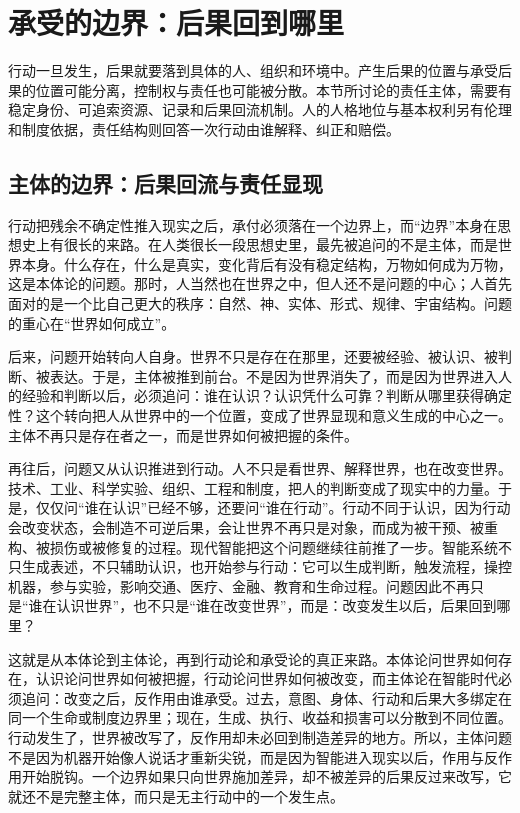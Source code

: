 \section{承受的边界：后果回到哪里}

行动一旦发生，后果就要落到具体的人、组织和环境中。产生后果的位置与承受后果的位置可能分离，控制权与责任也可能被分散。本节所讨论的责任主体，需要有稳定身份、可追索资源、记录和后果回流机制。人的人格地位与基本权利另有伦理和制度依据，责任结构则回答一次行动由谁解释、纠正和赔偿。

\subsection{主体的边界：后果回流与责任显现}

行动把残余不确定性推入现实之后，承付必须落在一个边界上，而“边界”本身在思想史上有很长的来路。在人类很长一段思想史里，最先被追问的不是主体，而是世界本身。什么存在，什么是真实，变化背后有没有稳定结构，万物如何成为万物，这是本体论的问题。那时，人当然也在世界之中，但人还不是问题的中心；人首先面对的是一个比自己更大的秩序：自然、神、实体、形式、规律、宇宙结构。问题的重心在“世界如何成立”。


后来，问题开始转向人自身。世界不只是存在在那里，还要被经验、被认识、被判断、被表达。于是，主体被推到前台。不是因为世界消失了，而是因为世界进入人的经验和判断以后，必须追问：谁在认识？认识凭什么可靠？判断从哪里获得确定性？这个转向把人从世界中的一个位置，变成了世界显现和意义生成的中心之一。主体不再只是存在者之一，而是世界如何被把握的条件\cite{kant1781kritik}。

再往后，问题又从认识推进到行动。人不只是看世界、解释世界，也在改变世界。技术、工业、科学实验、组织、工程和制度，把人的判断变成了现实中的力量。于是，仅仅问“谁在认识”已经不够，还要问“谁在行动”。行动不同于认识，因为行动会改变状态，会制造不可逆后果，会让世界不再只是对象，而成为被干预、被重构、被损伤或被修复的过程。现代智能把这个问题继续往前推了一步。智能系统不只生成表述，不只辅助认识，也开始参与行动：它可以生成判断，触发流程，操控机器，参与实验，影响交通、医疗、金融、教育和生命过程。问题因此不再只是“谁在认识世界”，也不只是“谁在改变世界”，而是：改变发生以后，后果回到哪里？

这就是从本体论到主体论，再到行动论和承受论的真正来路。本体论问世界如何存在，认识论问世界如何被把握，行动论问世界如何被改变，而主体论在智能时代必须追问：改变之后，反作用由谁承受。过去，意图、身体、行动和后果大多绑定在同一个生命或制度边界里；现在，生成、执行、收益和损害可以分散到不同位置。行动发生了，世界被改写了，反作用却未必回到制造差异的地方。所以，主体问题不是因为机器开始像人说话才重新尖锐，而是因为智能进入现实以后，作用与反作用开始脱钩。一个边界如果只向世界施加差异，却不被差异的后果反过来改写，它就还不是完整主体，而只是无主行动中的一个发生点。

